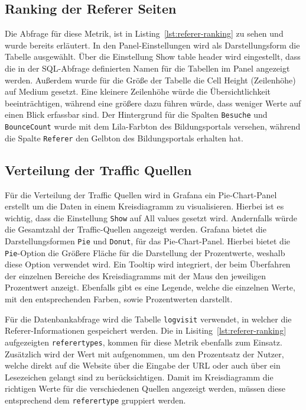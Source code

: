 \subsection{Ranking der Referer Seiten}
Die Abfrage für diese Metrik, ist in Listing~\ref{lst:referer-ranking} zu sehen und wurde bereits erläutert. In den Panel-Einstellungen wird als Darstellungsform die Tabelle ausgewählt. Über die Einstellung \glqq Show table header\grqq{} wird eingestellt, dass die in der SQL-Abfrage definierten Namen für die Tabellen im Panel angezeigt werden. Außerdem wurde für die Größe der Tabelle die \glqq Cell Height\grqq{}
(Zeilenhöhe) auf \glqq Medium\grqq{} gesetzt. Eine kleinere Zeilenhöhe würde die Übersichtlichkeit beeinträchtigen, während eine größere dazu führen würde, dass weniger Werte auf einen Blick erfassbar sind. Der Hintergrund für die Spalten \texttt{Besuche} und \texttt{Bounce\textunderscore Count} wurde mit dem Lila-Farbton des Bildungsportals versehen, während die Spalte \texttt{Referer} den Gelbton des Bildungsportals erhalten hat.

\subsection{Verteilung der Traffic Quellen}
Für die Verteilung der Traffic Quellen wird in Grafana ein Pie-Chart-Panel erstellt um die Daten in einem Kreisdiagramm zu visualisieren. Hierbei ist es wichtig, dass die Einstellung \texttt{Show} auf \glqq All values\grqq{} gesetzt wird. Andernfalls würde die Gesamtzahl der Traffic-Quellen angezeigt werden. Grafana bietet die Darstellungsformen \texttt{Pie} und \texttt{Donut}, für das Pie-Chart-Panel. Hierbei bietet die \texttt{Pie}-Option die Größere Fläche für die Darstellung der Prozentwerte, weshalb diese Option verwendet wird. Ein Tooltip wird integriert, der beim Überfahren der einzelnen Bereiche des Kreisdiagramms mit der Maus den jeweiligen Prozentwert anzeigt. Ebenfalls gibt es eine Legende, welche die einzelnen Werte, mit den entsprechenden Farben, sowie Prozentwerten darstellt.

Für die Datenbankabfrage wird die Tabelle \texttt{log\textunderscore visit} verwendet, in welcher die Referer-Informationen gespeichert werden. Die in Lisiting~\ref{lst:referer-ranking} aufgezeigten \texttt{referer\textunderscore types}, kommen für diese Metrik ebenfalls zum Einsatz. Zusätzlich wird der Wert \grqq{} mit aufgenommen, um den Prozentsatz der Nutzer, welche direkt auf die Website über die Eingabe der URL oder auch über ein Lesezeichen gelangt sind zu berücksichtigen. Damit im Kreisdiagramm die richtigen Werte für die verschiedenen Quellen angezeigt werden, müssen diese entsprechend dem \texttt{referer\textunderscore type} gruppiert werden.

